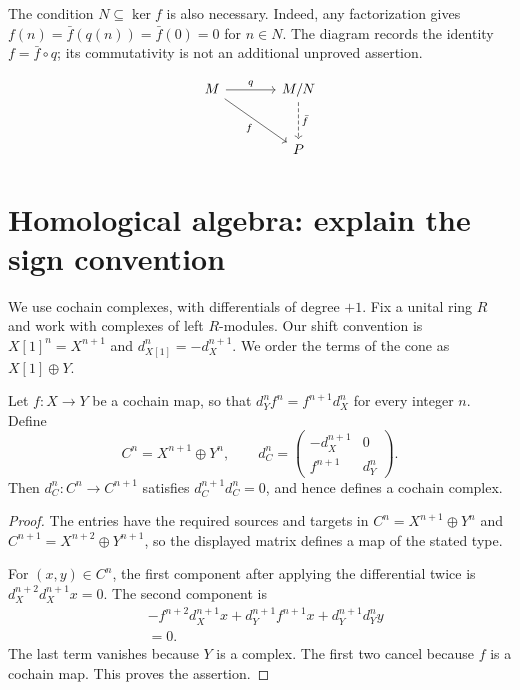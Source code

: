 \documentclass[11pt,a4paper]{article}
\begin{document}
The condition $N\subseteq\ker f$ is also necessary. Indeed, any factorization gives $f(n)=\bar f(q(n))=\bar f(0)=0$ for $n\in N$. The diagram records the identity $f=\bar f\circ q$; its commutativity is not an additional unproved assertion.

\[
\begin{tikzcd}[column sep=large,row sep=large]
M \arrow[r,"q"] \arrow[dr,"f"'] & M/N \arrow[d,dashed,"\bar f"]\\
 & P
\end{tikzcd}
\]

\clearpage
\section{Homological algebra: explain the sign convention}

We use cochain complexes, with differentials of degree $+1$. Fix a unital ring $R$ and work with complexes of left $R$-modules. Our shift convention is $X[1]^n=X^{n+1}$ and $d_{X[1]}^n=-d_X^{n+1}$. We order the terms of the cone as $X[1]\oplus Y$.

\begin{proposition}\label{thm:cone-differential}

Let $f\colon X\to Y$ be a cochain map, so that $d_Y^n f^n=f^{n+1}d_X^n$ for every integer $n$. Define
\[
C^n=X^{n+1}\oplus Y^n,\qquad
 d_C^n=
\begin{pmatrix}
-d_X^{n+1}&0\\
f^{n+1}&d_Y^n
\end{pmatrix}.
\]
Then $d_C^n\colon C^n\to C^{n+1}$ satisfies $d_C^{n+1}d_C^n=0$, and hence defines a cochain complex.

\end{proposition}

\begin{proof}

The entries have the required sources and targets in $C^n=X^{n+1}\oplus Y^n$ and $C^{n+1}=X^{n+2}\oplus Y^{n+1}$, so the displayed matrix defines a map of the stated type.

For $(x,y)\in C^n$, the first component after applying the differential twice is $d_X^{n+2}d_X^{n+1}x=0$. The second component is
\[
\begin{aligned}
 &-f^{n+2}d_X^{n+1}x
   +d_Y^{n+1}f^{n+1}x
   +d_Y^{n+1}d_Y^n y\\
 &=0.
\end{aligned}
\]
The last term vanishes because $Y$ is a complex. The first two cancel because $f$ is a cochain map. This proves the assertion.
\end{proof}
\end{document}
